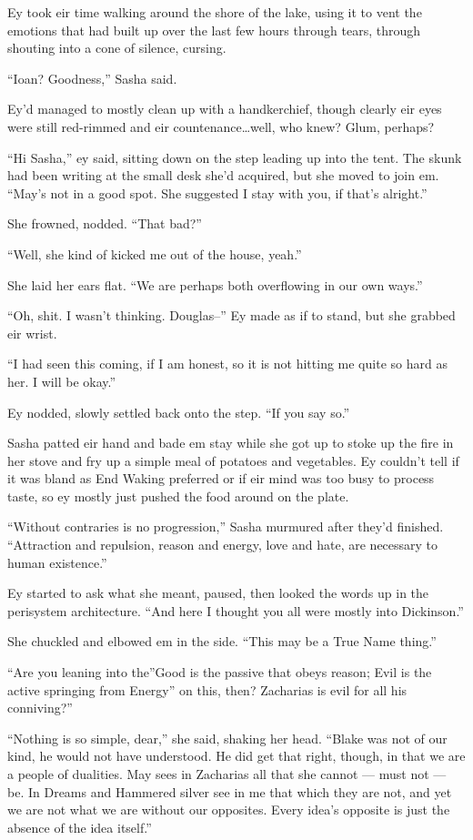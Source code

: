 Ey took eir time walking around the shore of the lake, using it to vent the emotions that had built up over the last few hours through tears, through shouting into a cone of silence, cursing.

``Ioan? Goodness,'' Sasha said.

Ey'd managed to mostly clean up with a handkerchief, though clearly eir eyes were still red-rimmed and eir countenance\ldots well, who knew? Glum, perhaps?

``Hi Sasha,'' ey said, sitting down on the step leading up into the tent. The skunk had been writing at the small desk she'd acquired, but she moved to join em. ``May's not in a good spot. She suggested I stay with you, if that's alright.''

She frowned, nodded. ``That bad?''

``Well, she kind of kicked me out of the house, yeah.''

She laid her ears flat. ``We are perhaps both overflowing in our own ways.''

``Oh, shit. I wasn't thinking. Douglas--'' Ey made as if to stand, but she grabbed eir wrist.

``I had seen this coming, if I am honest, so it is not hitting me quite so hard as her. I will be okay.''

Ey nodded, slowly settled back onto the step. ``If you say so.''

Sasha patted eir hand and bade em stay while she got up to stoke up the fire in her stove and fry up a simple meal of potatoes and vegetables. Ey couldn't tell if it was bland as End Waking preferred or if eir mind was too busy to process taste, so ey mostly just pushed the food around on the plate.

``Without contraries is no progression,'' Sasha murmured after they'd finished. ``Attraction and repulsion, reason and energy, love and hate, are necessary to human existence.''

Ey started to ask what she meant, paused, then looked the words up in the perisystem architecture. ``And here I thought you all were mostly into Dickinson.''

She chuckled and elbowed em in the side. ``This may be a True Name thing.''

``Are you leaning into the''Good is the passive that obeys reason; Evil is the active springing from Energy'' on this, then? Zacharias is evil for all his conniving?''

``Nothing is so simple, dear,'' she said, shaking her head. ``Blake was not of our kind, he would not have understood. He did get that right, though, in that we are a people of dualities. May sees in Zacharias all that she cannot — must not — be. In Dreams and Hammered silver see in me that which they are not, and yet we are not what we are without our opposites. Every idea's opposite is just the absence of the idea itself.''

